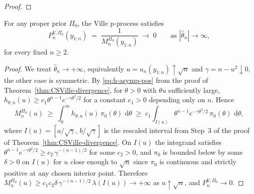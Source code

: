 \documentclass[12pt, a4paper]{report}
\newcommand{\dd}{\,\mathrm{d}}
\newcommand{\1}{\mathbf{1}}
\begin{document}
\begin{proof}
\end{proof}

\begin{corollary}\label{cor:Ville-pdegen}
For any proper prior \(\Pi_0\), the Ville p-process satisfies
\[
  P_n^{V,\Pi_0}(y_{1:n})\;=\;\frac{1}{M_n^{\Pi_0}(y_{1:n})}
  \;\longrightarrow\;0\qquad\text{as }|\widehat\theta_n|\to\infty,
\]
for every fixed \(n\geq 2\).
\end{corollary}

\begin{proof}
We treat \(\widehat\theta_n\to+\infty\), equivalently
\(u = u_n(y_{1:n})\uparrow\sqrt n\) and \(\gamma = n-u^2\downarrow 0\), the other case is symmetric. By \eqref{eq:h-asymp-pos} from the proof
of Theorem~\ref{thm:CSVille-divergence}, for \(\theta>0\) with \(\theta u\)
sufficiently large,
\(h_{\theta,n}(u)\geq c_1\theta^{n-1}e^{-\gamma\theta^2/2}\)
for a constant \(c_1>0\) depending only on \(n\). Hence
\[
  M_n^{\Pi_0}(u) \;\geq\; \int_0^\infty h_{\theta,n}(u)\,\pi_0(\theta)\,\dd\theta
  \;\geq\; c_1\int_{I(u)} \theta^{n-1}e^{-\gamma\theta^2/2}\,\pi_0(\theta)\,\dd\theta,
\]
where \(I(u) = [a/\sqrt\gamma,\,b/\sqrt\gamma]\) is the rescaled interval from Step~3 of the proof of Theorem~\ref{thm:CSVille-divergence}. On \(I(u)\) the integrand satisfies \(\theta^{n-1}e^{-\gamma\theta^2/2}\geq c_2\,\gamma^{-(n-1)/2}\)
for some \(c_2>0\), and \(\pi_0\) is bounded below by some \(\delta>0\) on \(I(u)\) for \(u\) close enough to \(\sqrt n\) since \(\pi_0\) is continuous and strictly positive at any chosen interior
point. Therefore \(M_n^{\Pi_0}(u)\geq c_1c_2\delta\,\gamma^{-(n-1)/2}\,
\lambda(I(u))\to+\infty\) as \(u\uparrow\sqrt n\), and \(P_n^{V,\Pi_0}\to 0\).
\end{proof}
\end{document}
